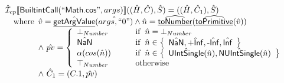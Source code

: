 \documentclass{article}
\newcommand{\SF}[1]{\mbox{\textsf{#1}}}
\newcommand{\wherec}[1]{{\rm where}\begin{array}[t]{l}#1\end{array}}
\newcommand{\ifc}[1]{{\rm if}\begin{array}[t]{l}#1\end{array}}
\newcommand{\owc}{{\rm otherwise}}
\newcommand{\aI}{\hat{\mathcal{I}}}
\newcommand{\set}[1]{\left\{\begin{array}{l}#1\end{array}\right\}}
\newcommand{\lbr}{\llbracket}
\newcommand{\rbr}{\rrbracket}
\newcommand{\hf}[1]{\underline{\sf #1}}
\newcommand{\ahf}[1]{\widehat{\underline{\sf #1}}}
\begin{document}
\[\begin{array}{l}
\aI _{cp}\lbr \SF{BuiltintCall}(``\SF{Math.cos}",args)\rbr((\hat{H},\hat{C}), \hat{S})
  = ((\hat{H}, \hat{C}_1), \hat{S})\\
\quad\wherec{
  \hat{v}=\hat{\hf{getArgValue}}(\hat{args, ``0"}) \land \hat{n}=\ahf{toNumber}(\ahf{toPrimitive}(\hat{v}))\\
  \land\ \hat{pv}   = 
  \left\{
    \begin{array}{l@{\quad\quad\quad}l}
      \bot_{Number} & \ifc{\hat{n} = \bot_{Number}}\\
      \hat{\SF{NaN}} & \ifc{\hat{n} \in\set{\hat{\SF{NaN}}, \hat{\SF{+Inf}}, \hat{\SF{-Inf}}, \hat{\SF{Inf}}}}\\
      \alpha(cos(\hat{n})) & \ifc{\hat{n} \in \set{\hat{\SF{UIntSingle}}(\hat{n}), \hat{\SF{NUIntSingle}}(\hat{n})}}\\
      \top_{Number} & \owc\\
    \end{array}
  \right.\\
  \land\ \hat{C}_1 = (C.1, \hat{pv})
  }\\
\\\\


\end{array}
\]
\end{document}
